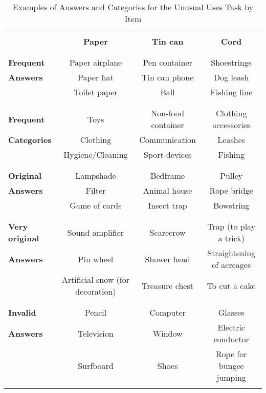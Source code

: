 {\begin{table}[H]\caption{Examples of Answers and Categories for the Unusual Uses Task by Item}
\begin{center}%
{\small\renewcommand{\arraystretch}{0.6}
\begin{tabular}{|l|c|c|c|} \hline\hline
&&& \\
									& \bf Paper  												& \bf Tin can 				& \bf Cord  										\\ 
&&& \\
\hline

&&& \\
\bf Frequent   		& Paper airplane 										& Pen container				& Shoestrings  							\\
\bf Answers    		& Paper hat  												& Tin can phone				& Dog leash 	  						\\
									& Toilet paper 											& Ball						 		& Fishing line  						\\
&&& \\
\hline

&&& \\			
\bf Frequent   		& Toys					 										& Non-food container 	& Clothing  accessories 			\\
\bf Categories 		& Clothing		  										& Communication  			& Leashes							  		\\ 
									& Hygiene/Cleaning									& Sport devices 			& Fishing							  		\\
&&& \\
\hline

&&& \\			
\bf Original   		& Lampshade		 											& Bedframe						& Pulley  \\
\bf Answers    		& Filter		 												& Animal house				&  Rope bridge   						\\
									& Game of cards & Insect trap 				& Bowstring 								\\
&&& \\
\hline

&&& \\			
\bf Very original & Sound amplifier										& Scarecrow						& Trap (to play a trick)		\\
\bf Answers				& Pin  wheel												& Shower head					& Straightening of acreages	\\
									& Artificial snow (for decoration) 	& Treasure chest			& To cut a cake 						\\
&&& \\
\hline

&&& \\			
\bf Invalid				& Pencil														& Computer						& Glasses										\\
\bf Answers				& Television												& Window							& Electric conductor				\\
									& Surfboard													& Shoes								& Rope for bungee jumping		\\
&&& \\
\hline\hline					
					
\end{tabular}}
\label{tab:paper3_Examples}
\end{center}
\end{table}}


